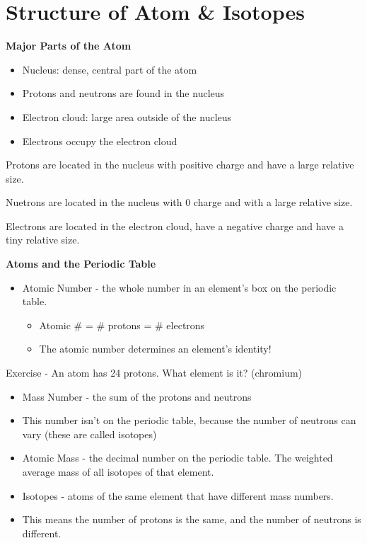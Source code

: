 \documentclass[../hchem.tex]{subfiles}
\begin{document}
\section{Structure of Atom \& Isotopes}
\textbf{Major Parts of the Atom}
\begin{itemize}
    \item Nucleus: dense, central part of the atom 
    \item Protons and neutrons are found in the nucleus
    
    \item Electron cloud: large area outside of the nucleus 
    \item Electrons occupy the electron cloud
\end{itemize}

Protons are located in the nucleus with positive charge and have a large relative size.

Nuetrons are located in the nucleus with 0 charge and with a large relative size.

Electrons are located in the electron cloud, have a negative charge and have a tiny relative size.

\textbf{Atoms and the Periodic Table}
\begin{itemize}
    \item Atomic Number - the whole number in an element's box on the periodic table.
    \begin{itemize}
        \item Atomic \# = \# protons = \# electrons 
        \item The atomic number determines an element's identity!
    \end{itemize}
\end{itemize}

Exercise - An atom has 24 protons. What element is it? (chromium)

\begin{itemize}
    \item Mass Number - the sum of the protons and neutrons 
    \item This number isn't on the periodic table, because the number of neutrons can vary (these are called isotopes)
    
    \item Atomic Mass - the decimal number on the periodic table. The weighted average mass of all isotopes of that element. 
    
    \item Isotopes - atoms of the same element that have different mass numbers.
    \item This means the number of protons is the same, and the number of neutrons is different.
\end{itemize}
\end{document}
